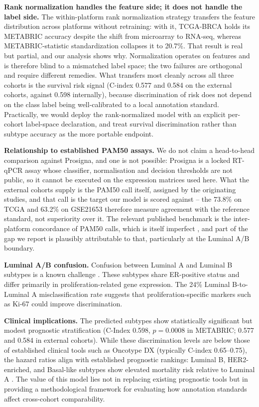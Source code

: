 \documentclass[10pt,journal,compsoc,twocolumn]{IEEEtran}
\begin{document}
\textbf{Rank normalization handles the feature side; it does not handle the label side.} The within-platform rank normalization strategy transfers the feature distribution across platforms without retraining: with it, TCGA-BRCA holds its METABRIC accuracy despite the shift from microarray to RNA-seq, whereas METABRIC-statistic standardization collapses it to 20.7\%. That result is real but partial, and our analysis shows why. Normalization operates on features and is therefore blind to a mismatched label space; the two failures are orthogonal and require different remedies. What transfers most cleanly across all three cohorts is the survival risk signal (C-index 0.577 and 0.584 on the external cohorts, against 0.598 internally), because discrimination of risk does not depend on the class label being well-calibrated to a local annotation standard. Practically, we would deploy the rank-normalized model with an explicit per-cohort label-space declaration, and treat survival discrimination rather than subtype accuracy as the more portable endpoint.

\textbf{Relationship to established PAM50 assays.} We do not claim a head-to-head comparison against Prosigna, and one is not possible: Prosigna is a locked RT-qPCR assay whose classifier, normalisation and decision thresholds are not public, so it cannot be executed on the expression matrices used here. What the external cohorts supply is the PAM50 call itself, assigned by the originating studies, and that call is the target our model is scored against -- the 73.8\% on TCGA and 63.2\% on GSE21653 therefore measure agreement with the reference standard, not superiority over it. The relevant published benchmark is the inter-platform concordance of PAM50 calls, which is itself imperfect \cite{bastien2012pam50}, and part of the gap we report is plausibly attributable to that, particularly at the Luminal A/B boundary.

\textbf{Luminal A/B confusion.} Confusion between Luminal A and Luminal B subtypes is a known challenge \cite{bastien2012pam50}. These subtypes share ER-positive status and differ primarily in proliferation-related gene expression. The 24\% Luminal B-to-Luminal A misclassification rate suggests that proliferation-specific markers such as Ki-67 could improve discrimination.

\textbf{Clinical implications.} The predicted subtypes show statistically significant but modest prognostic stratification (C-Index 0.598, $p = 0.0008$ in METABRIC; 0.577 and 0.584 in external cohorts). While these discrimination levels are below those of established clinical tools such as Oncotype DX (typically C-index 0.65--0.75), the hazard ratios align with established prognostic rankings: Luminal B, HER2-enriched, and Basal-like subtypes show elevated mortality risk relative to Luminal A \cite{prat2014research}. The value of this model lies not in replacing existing prognostic tools but in providing a methodological framework for evaluating how annotation standards affect cross-cohort comparability.
\end{document}
